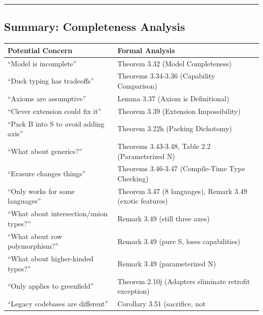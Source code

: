 \begin{center}\rule{0.5\linewidth}{0.5pt}\end{center}

\subsection{Summary: Completeness Analysis}\label{summary-completeness-analysis}

\small
\begin{longtable}[]{@{}
  >{\raggedright\arraybackslash}p{}
  >{\raggedright\arraybackslash}p{}@{}}
\toprule\noalign{}
\begin{minipage}[b]{\linewidth}\raggedright
Potential Concern
\end{minipage} & \begin{minipage}[b]{\linewidth}\raggedright
Formal Analysis
\end{minipage} \\
\midrule\noalign{}
\endhead
\bottomrule\noalign{}
\endlastfoot
``Model is incomplete'' & Theorem 3.32 (Model Completeness) \\
``Duck typing has tradeoffs'' & Theorems 3.34-3.36 (Capability Comparison) \\
``Axioms are assumptive'' & Lemma 3.37 (Axiom is Definitional) \\
``Clever extension could fix it'' & Theorem 3.39 (Extension
Impossibility) \\
``Pack B into S to avoid adding axis'' & Theorem 3.22h (Packing Dichotomy) \\
``What about generics?'' & Theorems 3.43-3.48, Table 2.2 (Parameterized
N) \\
``Erasure changes things'' & Theorems 3.46-3.47 (Compile-Time Type
Checking) \\
``Only works for some languages'' & Theorem 3.47 (8 languages), Remark
3.49 (exotic features) \\
``What about intersection/union types?'' & Remark 3.49 (still three
axes) \\
``What about row polymorphism?'' & Remark 3.49 (pure S, loses
capabilities) \\
``What about higher-kinded types?'' & Remark 3.49 (parameterized N) \\
``Only applies to greenfield'' & Theorem 2.10j (Adapters eliminate
retrofit exception) \\
``Legacy codebases are different'' & Corollary 3.51 (sacrifice, not

\end{longtable}
